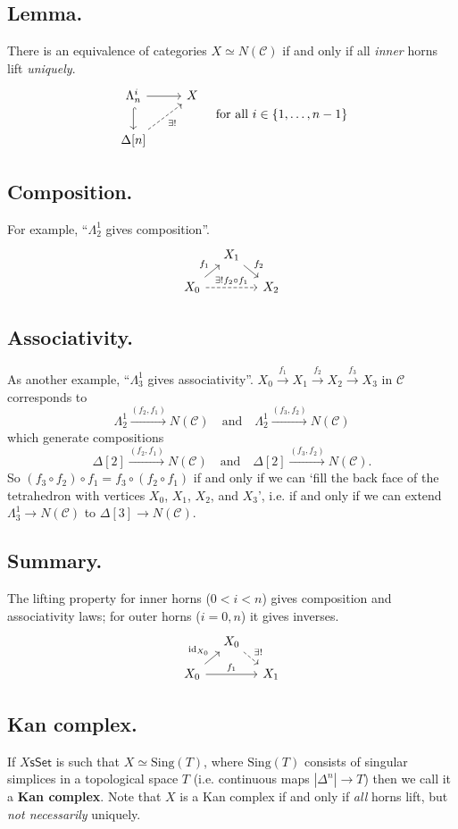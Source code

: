 \documentclass{article}
\numberwithin{equation}{subsection}
\renewcommand{\ss}[1]{\subsection{#1}}
\newcommand{\sset}{\mathsf{sSet}}
\newcommand{\C}{\mathcal{C}}
\newcommand{\id}{\mathrm{id}}
\begin{document}
        \ss{Lemma.}
            There is an equivalence of categories $X\simeq N(\C)$ if and only if all \emph{inner} horns lift \emph{uniquely}.
            \[
                \begin{tikzcd}
                    \Lambda_n^i \rar \dar[hook] & X\\
                    \Delta[n] \urar[dashed,swap]{\exists!} &
                \end{tikzcd}
                \quad\text{for all }i\in\{1,\ldots,n-1\}
            \]
        \ss{Composition.}
            For example, ``$\Lambda_2^1$ gives composition''.
            \[
                \begin{tikzcd}[row sep=1em,column sep=1em]
                    &X_1\ar{dr}{f_2}&\\
                    X_0\ar{ur}{f_1}\ar[dashed]{rr}{\exists!f_2\circ f_1}&&X_2
                \end{tikzcd}
            \]

        \ss{Associativity.}
            As another example, ``$\Lambda_3^1$ gives associativity''.
            $X_0\xrightarrow{f_1}X_1\xrightarrow{f_2}X_2\xrightarrow{f_3}X_3$ in $\C$ corresponds to
            \[
                \Lambda_2^1\xrightarrow{(f_2,f_1)}N(\C)
                \quad\text{and}\quad
                \Lambda_2^1\xrightarrow{(f_3,f_2)}N(\C)
            \]
            which generate compositions
            \[
                \Delta[2]\xrightarrow{(f_2,f_1)}N(\C)
                \quad\text{and}\quad
                \Delta[2]\xrightarrow{(f_3,f_2)}N(\C).
            \]
            So $(f_3\circ f_2)\circ f_1 = f_3\circ(f_2\circ f_1)$ if and only if we can `fill the back face of the tetrahedron with vertices $X_0$, $X_1$, $X_2$, and $X_3$', i.e. if and only if we can extend $\Lambda_3^1\to N(\C)$ to $\Delta[3]\to N(\C)$.

        \ss{Summary.}
            The lifting property for inner horns ($0<i<n$) gives composition and associativity laws; for outer horns ($i=0,n$) it gives inverses.
            \[
                \begin{tikzcd}[row sep=1em,column sep=1em]
                    &X_0\ar[dashed]{dr}{\exists!}&\\
                    X_0\ar{ur}{\id_{X_0}}\ar{rr}{f_1}&&X_1
                \end{tikzcd}
            \]

        \ss{Kan complex.}
            If $X\sset$ is such that $X\simeq\mathrm{Sing}(T)$, where $\mathrm{Sing}(T)$ consists of singular simplices in a topological space $T$ (i.e. continuous maps $|\Delta^n|\to T$) then we call it a \textbf{Kan complex}.
            Note that $X$ is a Kan complex if and only if \emph{all} horns lift, but \emph{not necessarily} uniquely.
\end{document}
